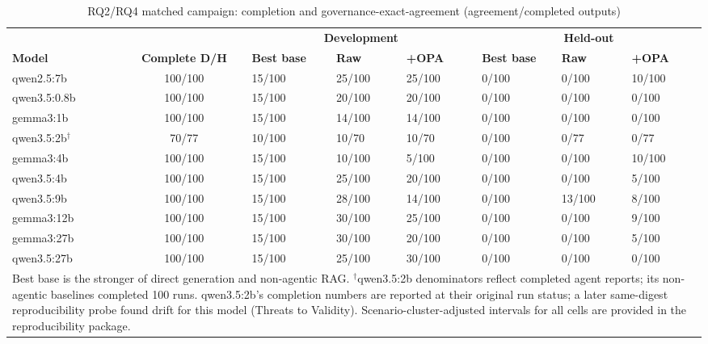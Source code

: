 \documentclass[journal,twoside,web]{ieeecolor}
\newif\ifrqtwotable  \rqtwotabletrue
\newif\ifrqtwoplot   \rqtwoplotfalse
\begin{document}
\ifrqtwotable
\begin{table}[t]
\centering
\caption{RQ2/RQ4 matched campaign: completion and governance-exact-agreement (agreement/completed outputs)}
\label{tab:rq2-governance}
\scriptsize
\setlength{\tabcolsep}{2.5pt}
\begin{tabular}{lcp{}p{}p{}p{}p{}p{}}
\hline
& & \multicolumn{3}{c}{\textbf{Development}} & \multicolumn{3}{c}{\textbf{Held-out}} \\
\textbf{Model} & \textbf{Complete D/H} & \textbf{Best base} & \textbf{Raw} & \textbf{+OPA} & \textbf{Best base} & \textbf{Raw} & \textbf{+OPA} \\
\hline
qwen2.5:7b   & 100/100 & 15/100 & 25/100 & 25/100 & 0/100 & 0/100 & 10/100 \\
qwen3.5:0.8b & 100/100 & 15/100 & 20/100 & 20/100 & 0/100 & 0/100 & 0/100 \\
gemma3:1b    & 100/100 & 15/100 & 14/100 & 14/100 & 0/100 & 0/100 & 0/100 \\
qwen3.5:2b$^\dagger$ & 70/77 & 10/100 & 10/70 & 10/70 & 0/100 & 0/77 & 0/77 \\
gemma3:4b    & 100/100 & 15/100 & 10/100 & 5/100 & 0/100 & 0/100 & 10/100 \\
qwen3.5:4b   & 100/100 & 15/100 & 25/100 & 20/100 & 0/100 & 0/100 & 5/100 \\
qwen3.5:9b   & 100/100 & 15/100 & 28/100 & 14/100 & 0/100 & 13/100 & 8/100 \\
gemma3:12b   & 100/100 & 15/100 & 30/100 & 25/100 & 0/100 & 0/100 & 9/100 \\
gemma3:27b   & 100/100 & 15/100 & 30/100 & 20/100 & 0/100 & 0/100 & 5/100 \\
qwen3.5:27b  & 100/100 & 15/100 & 25/100 & 30/100 & 0/100 & 0/100 & 0/100 \\
\hline
\multicolumn{8}{p{0.94\textwidth}}{\scriptsize Best base is the stronger of direct generation and non-agentic RAG. $^\dagger$qwen3.5:2b denominators reflect completed agent reports; its non-agentic baselines completed 100 runs. qwen3.5:2b's completion numbers are reported at their original run status; a later same-digest reproducibility probe found drift for this model (Threats to Validity). Scenario-cluster-adjusted intervals for all cells are provided in the reproducibility package.} \\
\end{tabular}
\end{table}
\fi
\ifrqtwoplot
\end{document}
